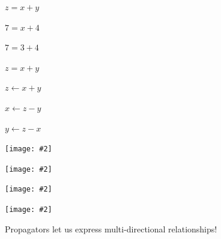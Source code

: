 \documentclass[usenames,dvipsnames,svgnames,table,aspectratio=1610,mathserif]{beamer}
\newcommand{\nl}{\vspace{\baselineskip}}
\newcommand{\imageslide}[2][1]{{
\begin{frame}\begin{center}
\texttt{[image: \#2]}
\end{center}\end{frame}
}}
\begin{document}
\begin{frame}
  \begin{center}
    \begin{LARGE}
      $z = x + y$
    \end{LARGE}
  \end{center}
\end{frame}


\begin{frame}
  \begin{center}
    \begin{LARGE}
      $7 = x + 4$
    \end{LARGE}
  \end{center}
\end{frame}


\begin{frame}
  \begin{center}
    \begin{LARGE}
      $7 = 3 + 4$
    \end{LARGE}
  \end{center}
\end{frame}


\begin{frame}
  \begin{center}
    \begin{LARGE}
      $z = x + y$
    \end{LARGE}
  \end{center}
\end{frame}


\begin{frame}
  \begin{center}
    \begin{LARGE}
      $z \leftarrow x + y$

      \nl

      $x \leftarrow z - y$

      \nl

      $y \leftarrow z - x$

    \end{LARGE}
  \end{center}
\end{frame}


\imageslide{diagrams/badd1.pdf}
\imageslide{diagrams/badd2.pdf}
\imageslide{diagrams/badd3.pdf}
\imageslide{diagrams/badd4.pdf}


\begin{frame}
\begin{center}
{\LARGE Propagators let us express multi-directional relationships!}
\end{center}
\end{frame}
\end{document}
